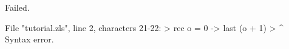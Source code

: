 \runverbatimfalse
{}
\begin{RunVerbatimMsg}
Failed.
\end{RunVerbatimMsg}
\begin{RunVerbatimErr}
File "tutorial.zls", line 2, characters 21-22:
>  rec o = 0 -> last (o + 1)
>                     ^
Syntax error.
\end{RunVerbatimErr}
